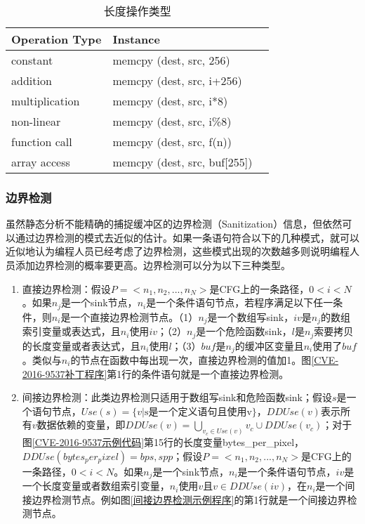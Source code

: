 {\begin{table}[ht]
\begin{center}
\caption{长度操作类型} \label{LENGTH_TYPE}
\begin{small}
\begin{tabular}{lll}
\hline
{\bf Operation Type } & {\bf Instance}\\ \hline
constant & memcpy (dest, src, 256) \\ \hline
addition & memcpy (dest, src, i+256) \\ \hline
multiplication & memcpy (dest, src, i*8) \\ \hline
non-linear & memcpy (dest, src, i\%8) \\ \hline
function call & memcpy (dest, src, f(n)) \\ \hline
array access & memcpy (dest, src, buf[255]) \\ \hline
\end{tabular}
\end{small}
\end{center}
\end{table}

\subsubsection{边界检测}

虽然静态分析不能精确的捕捉缓冲区的边界检测（Sanitization）信息，但依然可以通过边界检测的模式去近似的估计。如果一条语句符合以下的几种模式，就可以近似地认为编程人员已经考虑了边界检测，这些模式出现的次数越多则说明编程人员添加边界检测的概率要更高。边界检测可以分为以下三种类型。

\begin{enumerate}[1]
\item 直接边界检测：假设$P=<n_1, n_2,...,n_N>$是CFG上的一条路径，$0<i<N$。如果$n_j$是一个sink节点，$n_i$是一个条件语句节点，若程序满足以下任一条件，则$n_i$是一个直接边界检测节点。（1）$n_j$是一个数组写sink，$iv$是$n_j$的数组索引变量或表达式，且$n_i$使用$iv$；（2）$n_j$是一个危险函数sink，$l$是$n_j$索要拷贝的长度变量或者表达式，且$n_i$使用$l$；（3）$buf$是$n_j$的缓冲区变量且$n_i$使用了$buf$。类似与$n_i$的节点在函数中每出现一次，直接边界检测的值加1。图\ref{CVE-2016-9537补丁程序}第1行的条件语句就是一个直接边界检测。

\item 间接边界检测：此类边界检测只适用于数组写sink和危险函数sink；假设$s$是一个语句节点，$Use(s)=\{v|\text{s是一个定义语句且使用v}\}$，$DDUse(v)$表示所有$v$数据依赖的变量，即$DDUse(v) = \bigcup_{v_c \in Use(v)} v_c \cup DDUse(v_c)$；对于图\ref{CVE-2016-9537示例代码}第15行的长度变量{bytes\_per\_pixel}，$DDUse(bytes_per_pixel) = {bps, spp}$；假设$P=<n_1, n_2,...,n_N>$是CFG上的一条路径，$0<i<N$。如果$n_j$是一个sink节点，$n_i$是一个条件语句节点，$iv$是一个长度变量或者数组索引变量，$n_i$使用$v$且$v \in DDUse(iv)$，在$n_i$是一个间接边界检测节点。例如图\ref{间接边界检测示例程序}的第1行就是一个间接边界检测节点。


\end{enumerate}}
